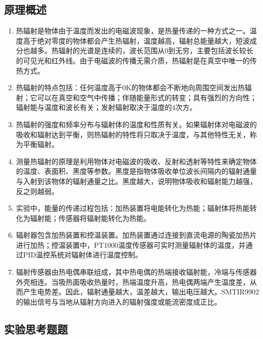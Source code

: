 \documentclass[dvipsnames, svgnames,a4paper,11pt]{article}
\begin{document}
	\subsection{原理概述}
	\begin{enumerate}
		\item 热辐射是物体由于温度而发出的电磁波现象，是热量传递的一种方式之一。温度高于绝对零度的物体都会产生热辐射，温度越高，辐射总能量越大，短波成分也越多。热辐射的光谱是连续的，波长范围从0到无穷，主要包括波长较长的可见光和红外线。由于电磁波的传播无需介质，热辐射是在真空中唯一的传热方式。
    
    \item 热辐射的特点包括：任何温度高于0K的物体都会不断地向周围空间发出热辐射；它可以在真空和空气中传播；伴随能量形式的转变；具有强烈的方向性；辐射能与温度和波长有关；发射辐射取决于温度的4次方。
    
    \item 热辐射的强度和频率分布与辐射体的温度和性质有关。如果辐射体对电磁波的吸收和辐射达到平衡，则热辐射的特性将只取决于温度，与其他特性无关，称为平衡辐射。
    
    \item 测量热辐射的原理是利用物体对电磁波的吸收、反射和透射等特性来确定物体的温度、表面积、黑度等参数。黑度是指物体吸收单位波长间隔内的辐射通量与入射到该物体的辐射通量之比。黑度越大，说明物体吸收和辐射能力越强，反之则越弱。
    
    \item 实验中，能量的传递过程包括：加热装置将电能转化为热能；辐射体将热能转化为辐射能；传感器将辐射能转化为热能。
    
    \item 辐射器包含加热装置和控温装置。加热装置通过连接到直流电源的陶瓷加热片进行加热；控温装置中，PT1000温度传感器可实时测量辐射体的温度，并通过PID温控系统对辐射体进行温度控制。
    
    \item 辐射传感器由热电偶串联组成，其中热电偶的热端接收辐射能，冷端与传感器外壳相连。当吸热面吸收热量时，热端温度升高，热电偶两端产生温度差，从而产生电势差。因此，辐射通量越大，温差越大，输出电压越大。SMTIR9902的输出信号与当地从辐射方向进入的辐射强度或能流密度成正比。
	\end{enumerate}
	
	
	
	\subsection{实验思考题题}
	
\end{document}
